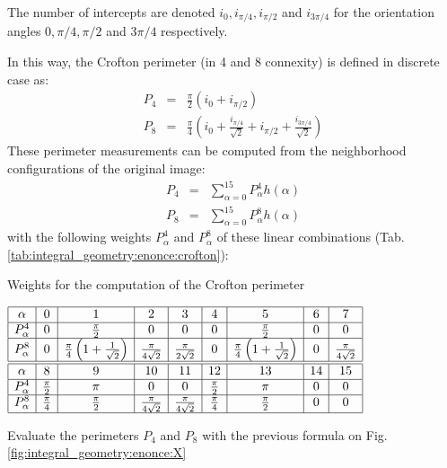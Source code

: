 The number of intercepts are denoted $i_0, i_{\pi/4}, i_{\pi/2}$ and $i_{3\pi/4}$ for the orientation angles $0, \pi/4, \pi/2$ and $3\pi/4$ respectively.

In this way, the Crofton perimeter (in 4 and 8 connexity) is defined in discrete case as:
\begin{eqnarray}
P_4&=&\frac{\pi}{2}\left(i_0+i_{\pi/2}\right)\\
P_8&=&\frac{\pi}{4}\left(i_0+\frac{i_{\pi/4}}{\sqrt{2}}+i_{\pi/2}+\frac{i_{3\pi/4}}{\sqrt{2}}\right)
\end{eqnarray}
These perimeter measurements can be computed from the neighborhood configurations of the original image:\vspace*{-15pt}
\begin{eqnarray}
P_4&=&\sum_{\alpha=0}^{15}P^4_{\alpha}h(\alpha)\\
P_8&=&\sum_{\alpha=0}^{15}P^8_{\alpha}h(\alpha)
\end{eqnarray}
with the following weights $P^4_{\alpha}$ and $P^8_{\alpha}$ of these linear combinations (Tab. \ref{tab:integral_geometry:enonce:crofton}):

\begin{table}[H]
\centering\caption{Weights for the computation of the Crofton perimeter}%
$\begin{array}{|c|c|c|c|c|c|c|c|c|}
\hline
\alpha&0&1&2&3&4&5&6&7\\\hline
P^4_{\alpha}&0&\frac{\pi}{2}&0&0&0&\frac{\pi}{2}&0&0\\\hline
P^8_{\alpha}&0&\frac{\pi}{4}\left(1+\frac{1}{\sqrt{2}}\right)&\frac{\pi}{4\sqrt{2}}&\frac{\pi}{2\sqrt{2}}&0&\frac{\pi}{4}\left(1+\frac{1}{\sqrt{2}}\right)&0&\frac{\pi}{4\sqrt{2}}\\
\hline
\hline
\alpha&8&9&10&11&12&13&14&15 \\ \hline
P^4_{\alpha}&\frac{\pi}{2}&\pi&0&0&\frac{\pi}{2}&\pi&0&0 \\ \hline
P^8_{\alpha}&\frac{\pi}{4}&\frac{\pi}{2}&\frac{\pi}{4\sqrt{2}}&\frac{\pi}{4\sqrt{2}}&\frac{\pi}{4}&\frac{\pi}{2}&0&0 \\
\hline
\end{array}$
\label{tab:integral_geometry:enonce:crofton}
\end{table}

\begin{qbox}
 Evaluate the perimeters $P_4$ and $P_8$ with the previous formula on Fig.\ref{fig:integral_geometry:enonce:X}
\end{qbox}
